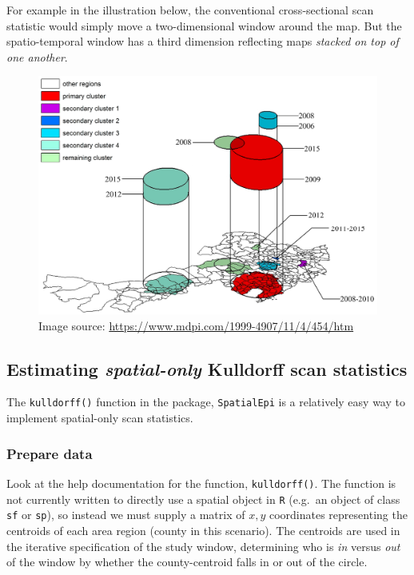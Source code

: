 \documentclass[
]{book}
\begin{document}
For example in the illustration below, the conventional cross-sectional scan statistic would simply move a two-dimensional window around the map. But the spatio-temporal window has a third dimension reflecting maps \emph{stacked on top of one another}.

\begin{figure}
\centering
\includegraphics{images/spatio-temporal-window.png}
\caption{\label{fig:unnamed-chunk-8}Image source: \url{https://www.mdpi.com/1999-4907/11/4/454/htm}}
\end{figure}

\hypertarget{estimating-spatial-only-kulldorff-scan-statistics}{%
\subsection{\texorpdfstring{Estimating \emph{spatial-only} Kulldorff scan statistics}{Estimating spatial-only Kulldorff scan statistics}}\label{estimating-spatial-only-kulldorff-scan-statistics}}

The \texttt{kulldorff()} function in the package, \texttt{SpatialEpi} is a relatively easy way to implement spatial-only scan statistics.

\hypertarget{prepare-data}{%
\subsubsection{Prepare data}\label{prepare-data}}

Look at the help documentation for the function, \texttt{kulldorff()}. The function is not currently written to directly use a spatial object in \texttt{R} (e.g.~an object of class \texttt{sf} or \texttt{sp}), so instead we must supply a matrix of \(x,y\) coordinates representing the centroids of each area region (county in this scenario). The centroids are used in the iterative specification of the study window, determining who is \emph{in} versus \emph{out} of the window by whether the county-centroid falls in or out of the circle.
\end{document}
